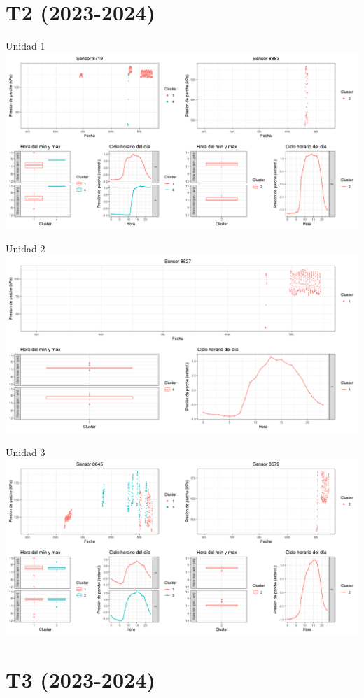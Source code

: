 \documentclass[
  letterpaper,
  DIV=11,
  numbers=noendperiod]{scrreprt}
\begin{document}
\chapter{T2 (2023-2024)}

Unidad 1
\includegraphics{figuras/02_turgor_limpiado/2023_2024_Rio_Claro_T2_Unidad_1.png}

Unidad 2
\includegraphics{figuras/02_turgor_limpiado/2023_2024_Rio_Claro_T2_Unidad_2.png}

Unidad 3
\includegraphics{figuras/02_turgor_limpiado/2023_2024_Rio_Claro_T2_Unidad_3.png}

\chapter{T3 (2023-2024)}
\end{document}
